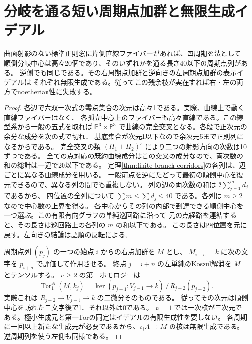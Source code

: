 \section{分岐を通る短い周期点加群と無限生成イデアル}
\label{sec:periodic-branch-obstruction}
\begin{theorem}\label{thm:periodic-branch-obstruction}
曲面射影のない標準正則窓に片側直線ファイバーがあれば、四周期を法として
順側分岐中心は高々20個であり、そのいずれかを通る長さ40以下の周期点列がある。
逆側でも同じである。その右周期点加群と逆向きの左周期点加群の表示イデアルは
それぞれ無限生成である。従ってこの残余枝が実在すれば右・左の両方でnoetherian性に失敗する。
\end{theorem}
\begin{proof}
各辺で六双一次式の零点集合の次元は高々1である。実際、曲線上で動く直線ファイバーはなく、
各孤立中心上のファイバーも高々直線である。この線型系から一般の五式を取れば
$\mathbb P^3\times\mathbb P^3$ で曲線の完全交叉となる。各段で正次元の余分な成分を次の式で切れ、
基底集合が次元1以下なので余次元5まで正則列になるからである。
完全交叉の類 $(H_1+H_2)^5$ により二つの射影方向の次数は10ずつである。
全ての点対応の既約曲線成分はこの交叉の成分なので、両次数の和の総計は一辺で20以下である。
定理\ref{thm:finite-branch-corridors}の各列は、辺ごとに異なる曲線成分を用いる。
一般前点を逆にたどって最初の順側中心を復元できるので、異なる列の間でも重複しない。
列の辺の両次数の和は $2\sum_{j=1}^m d_j$ であるから、
四位置の全列について $\sum m\le\sum d_j\le40$ である。各列は $m\ge2$ なので中心数の上界を得る。
各中心からその列の内部で到達できる順側中心を一つ選ぶ。この有限有向グラフの単純巡回路に沿って
元の点経路を連結すると、その長さは巡回路上の各列の $m$ の和以下である。
この長さは四位置を元に戻す。左向きの結論は語順の反転による。

周期点列 $(p_j)$ の一つの始点 $i$ からの右点加群を $M$ とし、
$M_{i+n}=k$ に次の文字を $p_{i+n}$ で評価して作用させる。
終点 $j=i+n$ の左単純のKoszul解消を $M$ とテンソルする。
$n\ge2$ の第一ホモロジーは
\[
 \operatorname{Tor}^A_1(M,k_j)
   =\ker(p_{j-1}:V_{j-1}\to k)\,/\,R_{j-2}(p_{j-2}) .
\]
実際これは $R_{j-2}\to V_{j-1}\to k$ の二微分そのものである。
従ってその次元は順側中心を訪れた二文字後で1、それ以外は0である。
$n=1$ では一次核が三次元である。極小生成元と第一Torの同定はイデアルの有限生成性を要しない。
各周期に一回以上新たな生成元が必要であるから、$e_i A\to M$ の核は無限生成である。
逆周期列を使う左側も同様である。
\end{proof}


